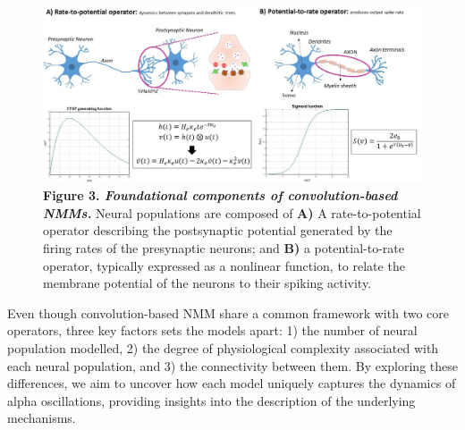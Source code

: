 \documentclass[12pt,twoside]{article}
\begin{document}

\vspace{-3mm}
\begin{figure}[H] 
    \includegraphics[width=\linewidth]{Images/Common_elem_2.png}
    \caption*{\textbf{Figure 3. \textit{Foundational components of convolution-based NMMs.}} Neural populations are composed of \textbf{A)} A rate-to-potential operator describing the postsynaptic potential generated by the firing rates of the presynaptic neurons; and \textbf{B)} a potential-to-rate operator, typically expressed as a nonlinear function, to relate the membrane potential of the neurons to their spiking activity.}
    \label{fig:Common_NMM}
\end{figure}
\vspace{-\baselineskip} 


Even though convolution-based NMM share a common framework with two core operators, three key factors sets the models apart: 1) the number of neural population modelled, 2) the degree of physiological complexity associated with each neural population, and 3) the connectivity between them. By exploring these differences, we aim to uncover how each model uniquely captures the dynamics of alpha oscillations, providing insights into the description of the underlying mechanisms. 
\end{document}
